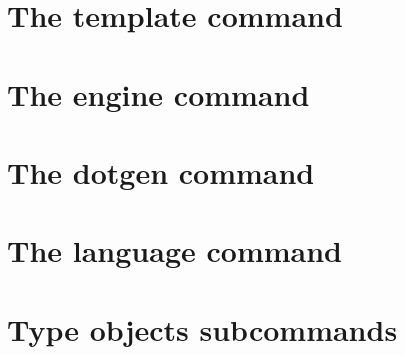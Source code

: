 %
%
%
%
%
\section{The template command}


\section{The engine command}


\section{The dotgen command}


\section{The language command}


\section{Type objects subcommands}

